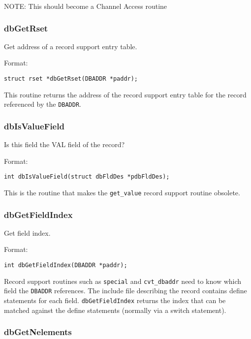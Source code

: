 NOTE: This should become a Channel Access routine

\subsubsection{dbGetRset}

Get address of a record support entry table.

Format:

\begin{verbatim}
struct rset *dbGetRset(DBADDR *paddr);
\end{verbatim}

This routine returns the address of the record support entry table for the record referenced by the \verb|DBADDR|.

\subsubsection{dbIsValueField}

Is this field the VAL field of the record?

Format:

\begin{verbatim}
int dbIsValueField(struct dbFldDes *pdbFldDes);
\end{verbatim}

This is the routine that makes the \verb|get_value| record support routine obsolete.

\subsubsection{dbGetFieldIndex}

Get field index.

Format:

\begin{verbatim}
int dbGetFieldIndex(DBADDR *paddr);
\end{verbatim}

Record support routines such as \verb|special| and \verb|cvt_dbaddr| need to know which field the \verb|DBADDR| references. The 
include file describing the record contains define statements for each field. \verb|dbGetFieldIndex| returns the index that 
can be matched against the define statements (normally via a switch statement).

\subsubsection{dbGetNelements}

